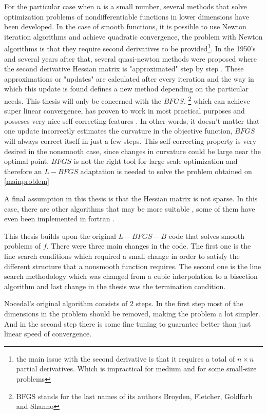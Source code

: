 For the particular case when $n$ is a small number, several methods that solve optimization problems of nondifferentiable functions in lower dimensions \citep{kiwiel85} have been developed. In the case of smooth functions, it is possible to use Newton iteration algorithms and achieve quadratic convergence, the problem with Newton algorithms is that they require second derivatives to be provided\footnote{the main issue with the second derivative is that it requires a total of $n \times n$ partial derivatives. Which is impractical for medium and for some small-size problems}. In the 1950's and several years after that, several quasi-newton methods were proposed where the second derivative Hessian matrix is "approximated" step by step \citep{unconstrained}. These approximations or "updates" are calculated after every iteration and the way in which this update is found defines a new method depending on the particular needs. This thesis will only be concerned with the $BFGS$. \footnote{BFGS stands for the last names of its authors Broyden, Fletcher, Goldfarb and Shanno} which can achieve super linear convergence, has proven to work in most practical purposes and posseses very nice self correcting features \citep{selfcorrecting}. In other words, it doesn't matter that one update incorrectly estimates the curvature in the objective function, $BFGS$ will always correct itself in just a few steps. This self-correcting property is very desired in the nonsmooth case, since changes in curvature could be large near the optimal point. $BFGS$ is not the right tool for large scale optimization and therefore an $L-BFGS$ adaptation is needed to solve the problem obtained on \ref{mainproblem}

A final assumption in this thesis is that the Hessian matrix is not sparse. In this case, there are other algorithms that may be more suitable \citep{Fletcher96computingsparse, sparse}, some of them have even been implemented in fortran \citep{lancelot}.

This thesis builds upon the original $L-BFGS-B$ code \citep{lbfgsbsoftware} that solves smooth problems of $f$. There were three main changes in the code. The first one is the line search conditions which required a small change in order to satisfy the different structure that a nonsmooth function requires. The second one is the line search methodology which was changed from a cubic interpolation to a bisection algorithm and last change in the thesis was the termination condition.

Nocedal's original algorithm consists of $2$ steps. In the first step most of the dimensions in the problem should be removed, making the problem a lot simpler. And in the second step there is some fine tuning to guarantee better than just linear speed of convergence.

